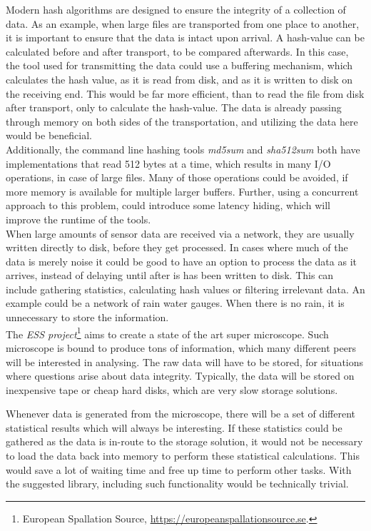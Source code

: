 \documentclass[a4paper]{article}
\begin{document}
Modern hash algorithms are designed to ensure the integrity of a collection of data. As an example, when large files are transported from one place to another, it is important to ensure that the data is intact upon arrival. A hash-value can be calculated before and after transport, to be compared afterwards. In this case, the tool used for transmitting the data could use a buffering mechanism, which calculates the hash value, as it is read from disk, and as it is written to disk on the receiving end. This would be far more efficient, than to read the file from disk after transport, only to calculate the hash-value. The data is already passing through memory on both sides of the transportation, and utilizing the data here would be beneficial.\\

Additionally, the command line hashing tools \textit{md5sum} and \textit{sha512sum} both have implementations that read 512 bytes at a time, which results in many I/O operations, in case of large files. Many of those operations could be avoided, if more memory is available for multiple larger buffers. Further, using a concurrent approach to this problem, could introduce some latency hiding, which will improve the runtime of the tools.\\

When large amounts of sensor data are received via a network, they are usually written directly to disk, before they get processed. In cases where much of the data is merely noise it could be good to have an option to process the data as it arrives, instead of delaying until after is has been written to disk. This can include gathering statistics, calculating hash values or filtering irrelevant data. An example could be a network of rain water gauges. When there is no rain, it is unnecessary to store the information.\\

The \textit{ESS project}\footnote{European Spallation Source, \url{https://europeanspallationsource.se}.}  aims to create a state of the art super microscope. Such microscope is bound to produce tons of information, which many different peers will be interested in analysing. The raw data will have to be stored, for situations where questions arise about data integrity. Typically, the data will be stored on inexpensive tape or cheap hard disks, which are very slow storage solutions. 

Whenever data is generated from the microscope, there will be a set of different statistical results which will always be interesting. If these statistics could be gathered as the data is in-route to the storage solution, it would not be necessary to load the data back into memory to perform these statistical calculations. This would save a lot of waiting time and free up time to perform other tasks. With the suggested library, including such functionality would be technically trivial.
\end{document}
